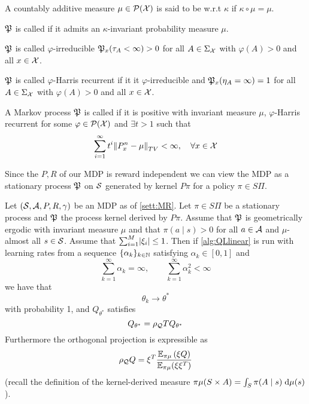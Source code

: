 \begin{defn}
  A countably additive measure $\mu \in \mathcal{P}(\mathcal{X})$ is said
  to be  w.r.t $\kappa$ if $\kappa \circ \mu = \mu$.
\end{defn}

\begin{defn}[Positivity]
  \leavevmode

  $\mathfrak{P}$ is called  if it admits an $\kappa$-invariant
  probability measure $\mu$.
\end{defn}

\begin{defn}[Irreducibility]
  $\mathfrak{P}$ is called $\varphi$-irreducible
  $\mathfrak{P}_x(\tau_A < \infty) > 0$
  for all $A \in \Sigma_\mathcal{X}$
  with $\varphi(A) > 0$
  and all $x \in \mathcal{X}$.
\end{defn}

\begin{defn}
  $\mathfrak{P}$ is called $\varphi$-Harris recurrent if
  it it $\varphi$-irreducible and
  $\mathfrak{P}_x(\eta_A = \infty) = 1$ for all $A \in \Sigma_\mathcal{X}$ with
  $\varphi(A) > 0$ and all $x \in \mathcal{X}$.
\end{defn}

\begin{defn}
  A Markov process $\mathfrak{P}$ is called  if
  it is positive with invariant measure $\mu$, $\varphi$-Harris recurrent
  for some $\varphi \in \mathcal{P}(\mathcal{X})$ and $\exists t>1$ such that
  \[ \sum_{i=1}^\infty t^i \norm{P^n_x - \mu}_{TV} < \infty,
  \quad \forall x \in \mathcal{X} \]
\end{defn}

Since the $P,R$ of our MDP is reward independent we can view the
MDP as a stationary process $\mathfrak{P}$ on $\mathcal{S}$
generated by kernel $P\pi$ for a policy $\pi \in S\Pi$.

\begin{thm}
  Let $(\mathcal{S}, \mathcal{A}, P, R, \gamma)$ be an MDP as of \cref{sett:MR}.
  Let $\pi \in S\Pi$ be a stationary process
  and $\mathfrak{P}$ the process kernel derived by $P\pi$.
  Assume that $\mathfrak{P}$ is geometrically ergodic with invariant
  measure $\mu$ and that
  $\pi(a \mid s) > 0$ for all $a \in \mathcal{A}$ and $\mu$-almost all
  $s \in \mathcal{S}$.
  Assume that $\sum_{i=1}^M \abs{\xi_i} \leq 1$.
  Then if \cref{alg:QLlinear} is run with learning rates from a sequence
  $\{ \alpha_k \}_{k \in \mathbb{N}}$ satisfying $\alpha_k \in [0,1]$ and
  \[ \sum_{k = 1}^\infty \alpha_k = \infty, \qquad
  \sum_{k = 1}^\infty \alpha_k^2 < \infty \]
  we have that
  \[ \theta_k \to \theta^* \]
  with probability 1, and $Q_{\theta^*}$ satisfies
  \[ Q_{\theta^*} = \rho_\mathcal{Q} T Q_{\theta^*} \]
  Furthermore the orthogonal projection is expressible as
  \[ \rho_\mathcal{Q} Q = \xi^T
    \frac{\mathbb{E}_{\pi\mu}\left( \xi Q \right)}{\mathbb{E}_{\pi\mu} (\xi \xi^T)}
  \]
  (recall the definition of the kernel-derived measure $\pi \mu(S \times A)
  = \int_S \pi(A \mid s) \; \mathrm{d} \mu(s)$).
  \label{thm:MeloRibeiro}
\end{thm}

